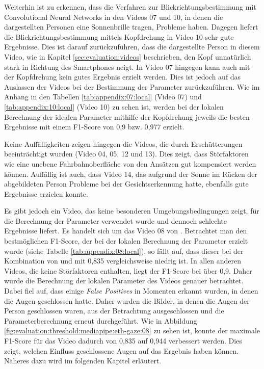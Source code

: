 Weiterhin ist zu erkennen, dass die Verfahren zur Blickrichtungsbestimmung mit Convolutional Neural Networks in den Videos 07 und 10, in denen die dargestellten Personen eine Sonnenbrille tragen, Probleme haben.  Dagegen liefert die Blickrichtungsbestimmung mittels Kopfdrehung in Video 10 sehr gute Ergebnisse. Dies ist darauf zurückzuführen, dass die dargestellte Person in diesem Video, wie in Kapitel \ref{sec:evaluation:videos} beschrieben, den Kopf unnatürlich stark in Richtung des Smartphones neigt. In Video 07 hingegen kann auch mit der Kopfdrehung kein gutes Ergebnis erzielt werden. Dies ist jedoch auf das Auslassen der Videos bei der Bestimmung der Parameter zurückzuführen. Wie im Anhang in den Tabellen \ref{tab:appendix:07:local} (Video 07) und \ref{tab:appendix:10:local} (Video 10) zu sehen ist, werden bei der lokalen Berechnung der idealen Parameter mithilfe der Kopfdrehung jeweils die besten Ergebnisse mit einem F1-Score von 0,9 bzw. 0,977 erzielt.

Keine Auffälligkeiten zeigen hingegen die Videos, die durch Erschütterungen beeinträchtigt wurden (Video 04, 05, 12 und 13). Dies zeigt, dass Störfaktoren wie eine unebene Fahrbahnoberfläche von den Ansätzen gut kompensiert werden können. Auffällig ist auch, dass Video 14, das aufgrund der Sonne im Rücken der abgebildeten Person Probleme bei der Gesichtserkennung hatte, ebenfalls gute Ergebnisse erzielen konnte.

Es gibt jedoch ein Video, das keine besonderen Umgebungsbedingungen zeigt, für die Berechnung der Parameter verwendet wurde und dennoch schlechte Ergebnisse liefert. Es handelt sich um das Video 08 von \florian. Betrachtet man den bestmöglichen F1-Score, der bei der lokalen Berechnung der Parameter erzielt wurde (siehe Tabelle \ref{tab:appendix:08:local}), so fällt auf, dass dieser bei der Kombination von \mediapipe und \ethg mit 0,835 vergleichsweise niedrig ist. In allen anderen Videos, die keine Störfaktoren enthalten, liegt der F1-Score bei über 0,9. Daher wurde die Berechnung der lokalen Parameter des Videos genauer betrachtet. Dabei fiel auf, dass einige \textit{False Positives} in Momenten erkannt wurden, in denen \florian die Augen geschlossen hatte. Daher wurden die Bilder, in denen die Augen der Person geschlossen waren, aus der Betrachtung ausgeschlossen und die Parameterberechnung erneut durchgeführt. Wie in Abbildung \ref{fig:evaluation:threshold:mediapipe:eth-gaze:08} zu sehen ist, konnte der maximale F1-Score für das Video dadurch von 0,835 auf 0,944 verbessert werden. Dies zeigt, welchen Einfluss geschlossene Augen auf das Ergebnis haben können. Näheres dazu wird im folgenden Kapitel erläutert.

